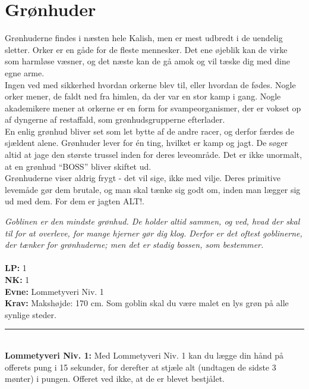 \section*{Grønhuder}
Grønhuderne findes i næsten hele Kalish, men er mest udbredt i de uendelig sletter. Orker er en gåde for de fleste mennesker. Det ene øjeblik kan de virke som harmløse væsner, og det næste kan de gå amok og vil tæske dig med dine egne arme.\\
Ingen ved med sikkerhed hvordan orkerne blev til, eller hvordan de fødes. Nogle orker mener, de faldt ned fra himlen, da der var en stor kamp i gang. Nogle akademikere mener at orkerne er en form for svampeorganismer, der er vokset op af dyngerne af restaffald, som grønhudsgrupperne efterlader.\\
En enlig grønhud bliver set som let bytte af de andre racer, og derfor færdes de sjældent alene. Grønhuder lever for én ting, hvilket er kamp og jagt. De søger altid at jage den største trussel inden for deres leveområde. Det er ikke unormalt, at en grønhud “BOSS” bliver skiftet ud.\\
Grønhuderne viser aldrig frygt - det vil sige, ikke med vilje. Deres primitive levemåde gør dem brutale, og man skal tænke sig godt om, inden man lægger sig ud med dem. For dem er jagten ALT!.
\begin{race*}[Gobliner]
\textit{Goblinen er den mindste grønhud. De holder altid sammen, og ved, hvad der skal til for at overleve, for mange hjerner gør dig klog. Derfor er det oftest goblinerne, der tænker for grønhuderne; men det er stadig bossen, som bestemmer.}\\
\\
\textbf{LP:} 1\\ 
\textbf{NK:} 1\\ 
\textbf{Evne:} Lommetyveri Niv. 1\\
\textbf{Krav:} Makshøjde: 170 cm. Som goblin skal du være malet en lys grøn på alle synlige steder.\\
\rule{\textwidth}{0.4pt}\\
\textbf{Lommetyveri Niv. 1:} Med Lommetyveri Niv. 1 kan du lægge din hånd på offerets pung i 15 sekunder, for derefter at stjæle alt (undtagen de sidste 3 mønter) i pungen. Offeret ved ikke, at de er blevet bestjålet.\\
\end{race*}

